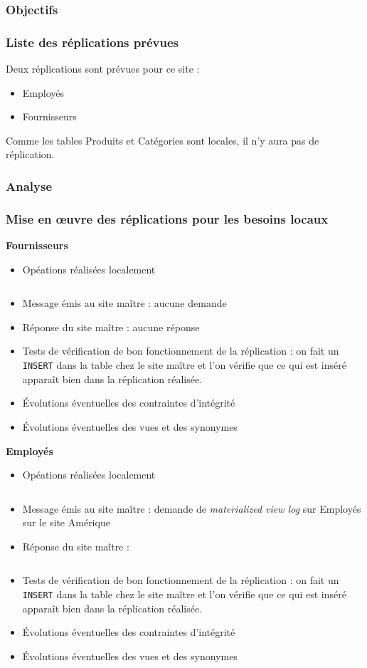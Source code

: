 \documentclass[10pt,a4paper]{article}
\theoremstyle{plain}
\begin{document}
\subsubsection{Objectifs}
%

\subsubsection{Liste des réplications prévues}
Deux réplications sont prévues pour ce site :
\begin{itemize}
    \item Employés
    \item Fournisseurs
\end{itemize}
Comme les tables Produits et Catégories sont locales, il n'y aura pas de réplication.

\subsubsection{Analyse}
%

\subsubsection{Mise en \oe uvre des réplications pour les besoins locaux}
\textbf{Fournisseurs}
\begin{itemize}
    \item Opéations réalisées localement
    \inputminted{sql}{EUS_V-A-5-a1.sql}
    \item Message émis au site maître : aucune demande
    \item Réponse du site maître : aucune réponse
    \item Tests de vérification de bon fonctionnement de la réplication : on fait un \verb|INSERT| dans la table chez le site maître et l'on vérifie que ce qui est inséré apparaît bien dans la réplication réalisée.
    \item Évolutions éventuelles des contraintes d'intégrité
    \item Évolutions éventuelles des vues et des synonymes
\end{itemize}

\textbf{Employés}
\begin{itemize}
    \item Opéations réalisées localement
    \inputminted{sql}{EUS_V-A-5-b1.sql}
    \item Message émis au site maître : demande de \emph{materialized view log} sur Employés sur le site Amérique
    \item Réponse du site maître : \inputminted{sql}{EUS_V-A-5-b3.sql}
    \item Tests de vérification de bon fonctionnement de la réplication : on fait un \verb|INSERT| dans la table chez le site maître et l'on vérifie que ce qui est inséré apparaît bien dans la réplication réalisée.
    \item Évolutions éventuelles des contraintes d'intégrité
    \item Évolutions éventuelles des vues et des synonymes
\end{itemize}
\end{document}
